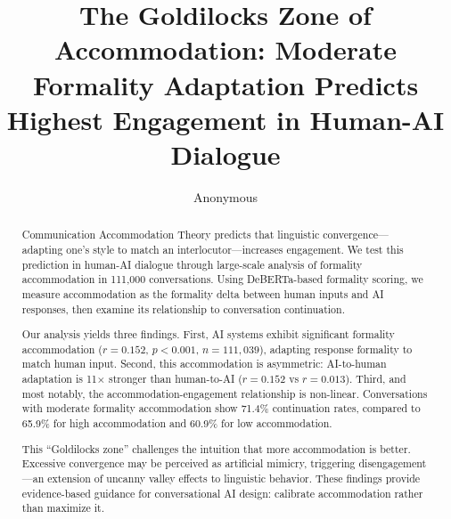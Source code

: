 \title{The Goldilocks Zone of Accommodation: Moderate Formality Adaptation Predicts Highest Engagement in Human-AI Dialogue}

\author{Anonymous}

\begin{abstract}
Communication Accommodation Theory predicts that linguistic convergence---adapting one's style to match an interlocutor---increases engagement. We test this prediction in human-AI dialogue through large-scale analysis of formality accommodation in 111,000 conversations. Using DeBERTa-based formality scoring, we measure accommodation as the formality delta between human inputs and AI responses, then examine its relationship to conversation continuation.

Our analysis yields three findings. First, AI systems exhibit significant formality accommodation ($r=0.152$, $p<0.001$, $n=111,039$), adapting response formality to match human input. Second, this accommodation is asymmetric: AI-to-human adaptation is 11$\times$ stronger than human-to-AI ($r=0.152$ vs $r=0.013$). Third, and most notably, the accommodation-engagement relationship is non-linear. Conversations with moderate formality accommodation show 71.4\% continuation rates, compared to 65.9\% for high accommodation and 60.9\% for low accommodation.

This ``Goldilocks zone'' challenges the intuition that more accommodation is better. Excessive convergence may be perceived as artificial mimicry, triggering disengagement---an extension of uncanny valley effects to linguistic behavior. These findings provide evidence-based guidance for conversational AI design: calibrate accommodation rather than maximize it.
\end{abstract}
